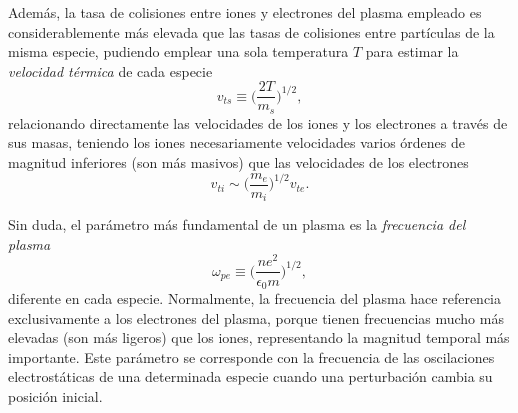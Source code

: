 Además, la tasa de colisiones entre iones y electrones del plasma empleado es considerablemente más elevada que las tasas de colisiones entre partículas de la misma especie, pudiendo emplear una sola temperatura $T$ para estimar la \emph{velocidad térmica} de cada especie 
\begin{equation}\label{eq:1.46}
  v_{ts} \equiv \bigg(\frac{2T}{m_{s}}\bigg)^{1/2},
\end{equation}
relacionando directamente las velocidades de los iones y los electrones a través de sus masas, teniendo los iones necesariamente velocidades varios órdenes de magnitud inferiores (son más masivos) que las velocidades de los electrones
\begin{equation}\label{eq:1.47}
  v_{ti} \sim \bigg(\frac{m_{e}}{m_{i}}\bigg)^{1/2}v_{te}.
\end{equation}

Sin duda, el parámetro más fundamental de un plasma es la \emph{frecuencia del plasma}\autocite{Thorne2017} 
\begin{equation}\label{eq:1.48}
  \omega_{pe} \equiv \bigg(\frac{ne^{2}}{\epsilon_{0}m}\bigg)^{1/2},
\end{equation}
diferente en cada especie. Normalmente, la frecuencia del plasma hace referencia exclusivamente a los electrones del plasma, porque tienen frecuencias mucho más elevadas (son más ligeros) que los iones, representando la magnitud temporal más importante. Este parámetro se corresponde con la frecuencia de las oscilaciones electrostáticas de una determinada especie cuando una perturbación cambia su posición inicial. 


